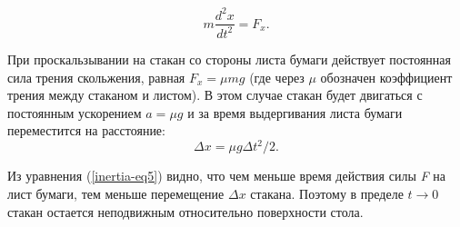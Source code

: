 \documentclass[../../../All.tex]{subfiles}
\begin{document}
 \begin{equation}\label{inertia-eq2}
 m\frac{d^{2} x}{d t^{2}} = F_{x}.
 \end{equation}

При проскальзывании на стакан со стороны листа бумаги действует постоянная сила трения скольжения, равная $ F_{x} = \mu mg $ (где через $\mu$ обозначен коэффициент трения между стаканом и листом). В этом случае стакан будет двигаться с постоянным ускорением $a = \mu g$ и за время выдергивания листа бумаги переместится на расстояние:
\begin{equation}\label{inertia-eq5}
\Delta x = \mu g\Delta t^{2}/2.
\end{equation}

Из уравнения (\ref{inertia-eq5}) видно, что чем меньше время действия силы \textit{F} на лист бумаги, тем меньше перемещение $ \Delta x $ стакана.
Поэтому в пределе \mbox{$ t\longrightarrow0 $} стакан остается неподвижным относительно поверхности стола.  
\end{document}
